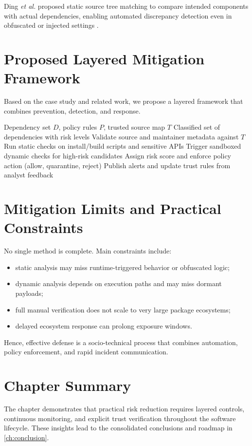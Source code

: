 Ding \textit{et al.} proposed static source tree matching to compare intended components with
actual dependencies, enabling automated discrepancy detection even in obfuscated or injected
settings \citep{ding2024dependency}.

\section{Proposed Layered Mitigation Framework}

Based on the case study and related work, we propose a layered framework that combines
prevention, detection, and response.

\begin{algorithm}[htbp]
\caption{Layered Screening for Third-party Dependencies}
\label{alg:layered-screening}
\begin{algorithmic}[1]
\Require Dependency set $D$, policy rules $P$, trusted source map $T$
\Ensure Classified set of dependencies with risk levels
\State Validate source and maintainer metadata against $T$
\State Run static checks on install/build scripts and sensitive APIs
\State Trigger sandboxed dynamic checks for high-risk candidates
\State Assign risk score and enforce policy action (allow, quarantine, reject)
\EndFor
\State Publish alerts and update trust rules from analyst feedback
\end{algorithmic}
\end{algorithm}

\section{Mitigation Limits and Practical Constraints}

No single method is complete. Main constraints include:

\begin{itemize}
\item static analysis may miss runtime-triggered behavior or obfuscated logic;
\item dynamic analysis depends on execution paths and may miss dormant payloads;
\item full manual verification does not scale to very large package ecosystems;
\item delayed ecosystem response can prolong exposure windows.
\end{itemize}

Hence, effective defense is a socio-technical process that combines automation,
policy enforcement, and rapid incident communication.

\section{Chapter Summary}

The chapter demonstrates that practical risk reduction requires layered controls,
continuous monitoring, and explicit trust verification throughout the software lifecycle.
These insights lead to the consolidated conclusions and roadmap in \cref{ch:conclusion}.


